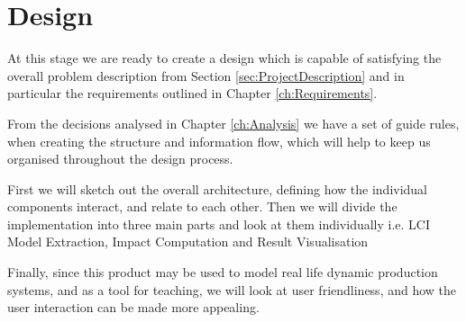 \chapter{Design}\label{ch:Design}

At this stage we are ready to create a design which is capable of satisfying the overall problem description from Section \ref{sec:ProjectDescription} and in particular the requirements outlined in Chapter \ref{ch:Requirements}.

From the decisions analysed in Chapter \ref{ch:Analysis} we have a set of guide rules, when creating the structure and information flow, which will help to keep us organised throughout the design process.

First we will sketch out the overall architecture, defining how the individual components interact, and relate to each other. Then we will divide the implementation into three main parts and look at them individually i.e. LCI Model Extraction, Impact Computation and Result Visualisation 

Finally, since this product may be used to model real life dynamic production systems, and as a tool for teaching, we will look at user friendliness, and how the user interaction can be made more appealing.